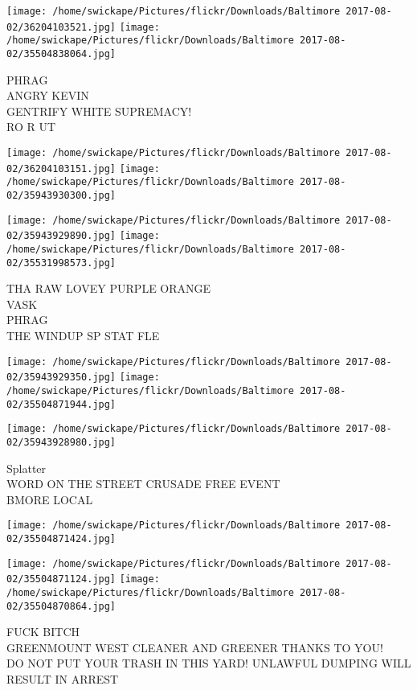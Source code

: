 \documentclass[10pt,letterpaper]{article}
\begin{document}
\texttt{[image: /home/swickape/Pictures/flickr/Downloads/Baltimore 2017-08-02/36204103521.jpg]}
\texttt{[image: /home/swickape/Pictures/flickr/Downloads/Baltimore 2017-08-02/35504838064.jpg]}

PHRAG\\
ANGRY KEVIN\\
GENTRIFY WHITE SUPREMACY!\\
RO R UT
\pagebreak

\texttt{[image: /home/swickape/Pictures/flickr/Downloads/Baltimore 2017-08-02/36204103151.jpg]}
\texttt{[image: /home/swickape/Pictures/flickr/Downloads/Baltimore 2017-08-02/35943930300.jpg]}

\texttt{[image: /home/swickape/Pictures/flickr/Downloads/Baltimore 2017-08-02/35943929890.jpg]}
\texttt{[image: /home/swickape/Pictures/flickr/Downloads/Baltimore 2017-08-02/35531998573.jpg]}

THA RAW LOVEY PURPLE ORANGE\\
VASK\\
PHRAG\\
THE WINDUP SP STAT FLE
\pagebreak

\texttt{[image: /home/swickape/Pictures/flickr/Downloads/Baltimore 2017-08-02/35943929350.jpg]}
\texttt{[image: /home/swickape/Pictures/flickr/Downloads/Baltimore 2017-08-02/35504871944.jpg]}

\texttt{[image: /home/swickape/Pictures/flickr/Downloads/Baltimore 2017-08-02/35943928980.jpg]}

Splatter\\
WORD ON THE STREET CRUSADE FREE EVENT\\
BMORE LOCAL
\pagebreak

\texttt{[image: /home/swickape/Pictures/flickr/Downloads/Baltimore 2017-08-02/35504871424.jpg]}

\vspace{0.25in}
\texttt{[image: /home/swickape/Pictures/flickr/Downloads/Baltimore 2017-08-02/35504871124.jpg]}
\texttt{[image: /home/swickape/Pictures/flickr/Downloads/Baltimore 2017-08-02/35504870864.jpg]}

FUCK BITCH\\
GREENMOUNT WEST CLEANER AND GREENER THANKS TO YOU!\\
DO NOT PUT YOUR TRASH IN THIS YARD!  UNLAWFUL DUMPING WILL RESULT IN ARREST
\pagebreak
\end{document}
